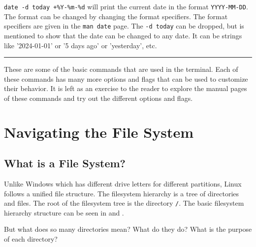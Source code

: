 \begin{ans}
  \texttt{date -d today +\%Y-\%m-\%d} will print the current date in the format
  \texttt{YYYY-MM-DD}. The format can be changed by changing the format specifiers.
  The format specifiers are given in the \texttt{man date} page. The \texttt{-d today} can
  be dropped, but is mentioned to show that the date can be changed to any date.
  It can be strings like '2024-01-01' or '5 days ago' or 'yesterday', etc.
\end{ans}

\vspace{5mm}
\hrule
\vspace{3mm}

These are some of the basic commands that are used in the terminal.
Each of these commands has many more options and flags that can be used to customize their behavior.
It is left as an exercise to the reader to explore the manual pages of these commands and try out the different options and flags.


\vfill
\pagebreak
\section{Navigating the File System}

\subsection{What is a File System?}

Unlike Windows which has different drive letters for different partitions, Linux follows a unified file structure. The filesystem hierarchy is a tree of directories and files. The root of the filesystem tree is the directory \texttt{/}. The basic filesystem hierarchy structure can be seen in  and .

But what does so many directories mean? What do they do? What is the purpose of each directory?


